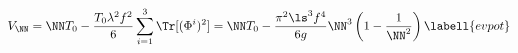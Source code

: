 \begin{equation}
V_\NN=\NN T_0-{T_0\lambda^2f^2\over6}\sum_{i=1}^3\Tr[(\Phi^i)^2]
=\NN T_0-{\pi^2\ls^3f^4\over6g}\NN^3\left(1-{1\over\NN^2}\right)
\labell{evpot}
\end{equation}

